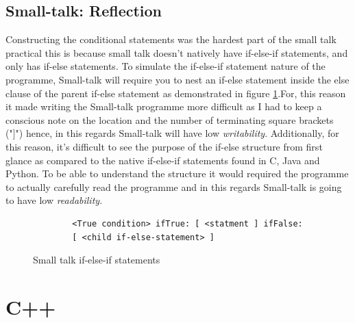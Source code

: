 \documentclass[
	12pt, %
]{fphw}
\begin{document}
\subsection{Small-talk: Reflection}
Constructing the conditional statements was the hardest part of the small talk
practical this is because small talk doesn't natively have if-else-if statements,
and only has if-else statements. To simulate the if-else-if statement nature of the
programme, Small-talk will require you to nest an if-else statement inside the else
clause of the parent if-else statement as demonstrated in figure \ref{ST:IF_ELSE}.For,
this reason it made writing the Small-talk programme more difficult as I had to
keep a conscious note on the location and the number of terminating square brackets
("]") hence, in this regards Small-talk will have low \emph{writability}. Additionally,
for this reason, it's difficult to see the purpose of the if-else structure from first
glance as compared to the native if-else-if statements found in C, Java and Python. To
be able to understand the structure it would required the programme to actually
carefully read the programme and in this regards Small-talk is going to have
low \emph{readability}.

\begin{figure}[!htp]
    \begin{problem}
        \begin{verbatim}
        <True condition> ifTrue: [ <statment ] ifFalse:
        [ <child if-else-statement> ]
        \end{verbatim}
    \end{problem}
    \caption{Small talk if-else-if statements}
    \label{ST:IF_ELSE}
\end{figure}

\section{C++}
\end{document}
